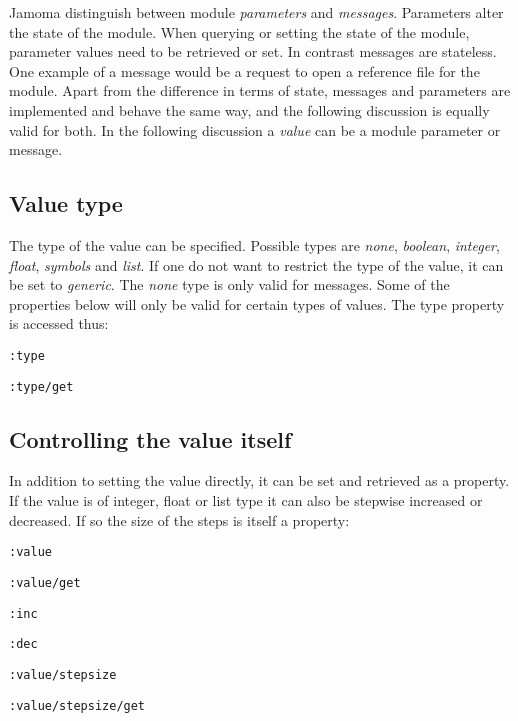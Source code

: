 \documentclass{sig-alternate}
\begin{document}
Jamoma distinguish between module \emph{parameters} and \emph{messages}. Parameters alter the state of the module. When querying or setting the state of the module, parameter values need to be retrieved or set. In contrast messages are stateless. One example of a message would be a request to open a reference file for the module. Apart from the difference in terms of state, messages and parameters are implemented and behave the same way, and the following discussion is equally valid for both. In the following discussion a \emph{value} can be a module parameter or message.




\subsection{Value type} %
\label{sub:type}

The type of the value can be specified. Possible types are \emph{none}, \emph{boolean}, \emph{integer}, \emph{float}, \emph{symbols} and \emph{list}. If one do not want to restrict the type of the value, it can be set to \emph{generic}. The \emph{none} type is only valid for messages. Some of the properties below will only be valid for certain types of values. The type property is accessed thus:

\texttt{:type}

\texttt{:type/get}





\subsection{Controlling the value itself} %
\label{sub:controlling_the_value_itself}

In addition to setting the value directly, it can be set and retrieved as a property. If the value is of integer, float or list type it can also be stepwise increased or decreased. If so the size of the steps is itself a property:

\texttt{:value}

\texttt{:value/get}

\texttt{:inc}

\texttt{:dec} 

\texttt{:value/stepsize}

\texttt{:value/stepsize/get}
\end{document}
